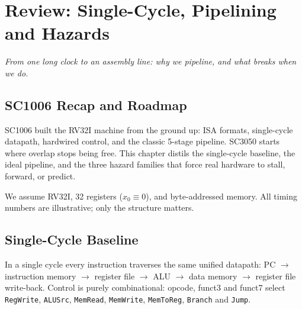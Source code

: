 \chapter{Review: Single-Cycle, Pipelining and Hazards}\label{ch:review}
\begin{center}\small\textit{From one long clock to an assembly line: why we pipeline, and what breaks when we do.}\end{center}

\section{SC1006 Recap and Roadmap}
SC1006 built the RV32I machine from the ground up: ISA formats, single-cycle datapath, hardwired control, and the classic 5-stage pipeline. SC3050 starts where overlap stops being free. This chapter distils the single-cycle baseline, the ideal pipeline, and the three hazard families that force real hardware to stall, forward, or predict.

We assume RV32I, 32 registers ($x_0\equiv0$), and byte-addressed memory. All timing numbers are illustrative; only the structure matters.

\section{Single-Cycle Baseline}
In a single cycle every instruction traverses the same unified datapath: PC $\to$ instruction memory $\to$ register file $\to$ ALU $\to$ data memory $\to$ register file write-back. Control is purely combinational: opcode, funct3 and funct7 select \texttt{RegWrite}, \texttt{ALUSrc}, \texttt{MemRead}, \texttt{MemWrite}, \texttt{MemToReg}, \texttt{Branch} and \texttt{Jump}.


